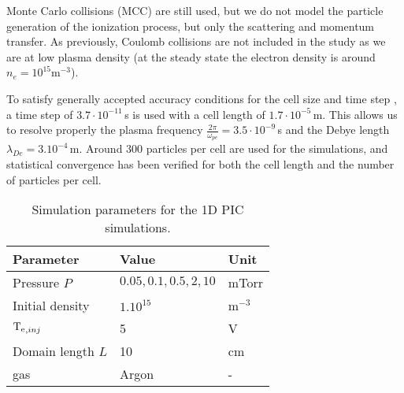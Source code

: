 Monte Carlo collisions (MCC) are still used, but we do not model the particle generation of the ionization process, but only the scattering and momentum transfer.
As previously, Coulomb collisions are not included in the study as we are at low plasma density (at the steady state the electron density is around $n_e = 10^{15}$m$^{-3}$).

To satisfy generally accepted accuracy conditions for the cell size and time step \citep{turner2013}, a time step of $3.7\cdot10^{-11}$\,s is used with a cell length of $1.7\cdot10^{-5}$\,m.
This allows us to resolve properly the plasma frequency $\frac{2 \pi}{\omega_{pe}} = 3.5\cdot10^{-9} $\,s and the Debye length $\lambda_{De} = 3.10^{-4}$\,m.
Around $300$ particles per cell are used for the simulations, and statistical convergence has been verified for both the cell length and the number of particles per cell.


\begin{table}
  \centering
  \begin{tabular}{lll}  \toprule
    Parameter & Value & Unit  \\ \midrule
    Pressure $P$ & $0.05,0.1,0.5, 2, 10$ & mTorr\\
    Initial density & $1 .10^{15}$ & m$^{-3}$\\
    $\mathrm{T_e}_{, inj}$& 5 & V\\
    Domain length $L$ & 10 & cm\\
    gas & Argon & -\\
    \bottomrule
  \end{tabular}
  \caption{Simulation parameters for the 1D PIC simulations.}
  \label{tab_1DPICParams}
\end{table}










